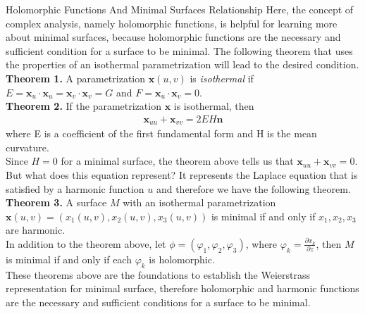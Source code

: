\documentclass[final]{beamer}
\newlength{\colwidth}
\begin{document}
\begin{frame}[t]
\begin{columns}[t]
\begin{column}{\colwidth}
\begin{alertblock}{Holomorphic Functions And Minimal Surfaces Relationship}
    Here, the concept of complex analysis, namely holomorphic functions, is helpful for learning more about minimal surfaces, because holomorphic functions are the necessary and sufficient condition for a surface to be minimal. The following theorem that uses the properties of an isothermal parametrization will lead to the desired condition.\\
    \vspace{\baselineskip}
    \textbf{Theorem 1.} A parametrization $\textbf{x}(u,v)$ is \emph{isothermal} if $E=\textbf{x}_u \cdot \textbf{x}_u = \textbf{x}_v \cdot \textbf{x}_v = G$ and $F= \textbf{x}_u \cdot \textbf{x}_v=0$.\\
    \vspace{\baselineskip}
    \textbf{Theorem 2.} If the parametrization $\textbf{x}$ is isothermal, then
    \begin{align*}
        \textbf{x}_{uu} +\textbf{x}_{vv}=2EH\textbf{n}
    \end{align*}
    where E is a coefficient of the first fundamental form and H is the mean curvature.\\
    \vspace{\baselineskip}
    Since $H=0$ for a minimal surface, the theorem above tells us that $\textbf{x}_{uu} +\textbf{x}_{vv}=0$. But what does this equation represent? It represents the Laplace equation that is satisfied by a harmonic function $u$ and therefore we have the following theorem.\\
    \vspace{\baselineskip}
    \textbf{Theorem 3.} A surface $M$ with an isothermal parametrization $\textbf{x}(u,v)=(x_1(u,v),x_2(u,v),x_3(u,v))$ is minimal if and only if $x_1,x_2,x_3$ are harmonic.\\
    \vspace{\baselineskip}
    In addition to the theorem above, let $\phi=(\varphi_1,\varphi_2,\varphi_3)$, where $\varphi_k=\frac{\partial x_k}{\partial z}$, then $M$ is minimal if and only if each $\varphi_k$ is holomorphic.\\
    These theorems above are the foundations to establish the Weierstrass representation for minimal surface, therefore holomorphic and harmonic functions are the necessary and sufficient conditions for a surface to be minimal.
    \vspace{\baselineskip}
  \end{alertblock}

\end{column}


\end{columns}
\end{frame}
\end{document}
